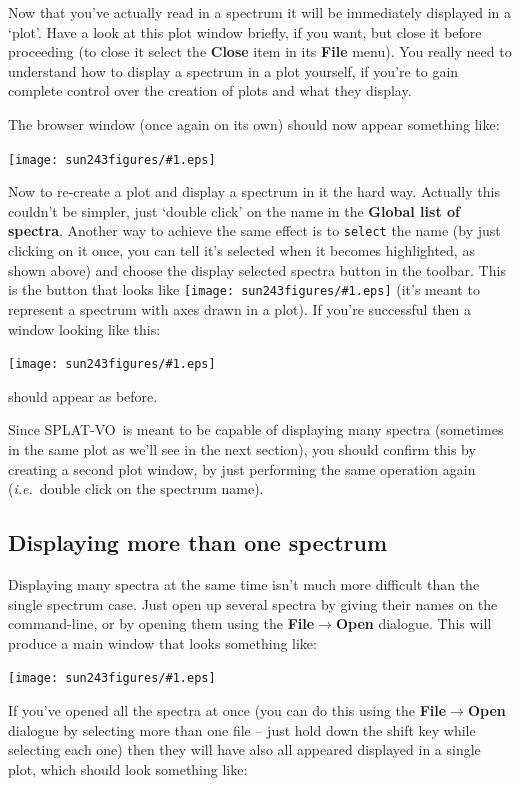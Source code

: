 \documentclass[twoside,11pt]{article}
\newcommand{\htmladdimg}[1]{}
\newcommand{\latexhtml}[2]{#1}
\newcommand{\xlabel}[1]{}
\renewcommand{\_}{\texttt{\symbol{95}}}
\newcommand{\SPLAT}{\textsf{SPLAT-VO}}
\newcommand{\mainfigure}[1]
{\begin{center}
 \latexhtml{\texttt{[image: sun243\_figures/\#1.eps]}}{\htmladdimg{#1.gif}}
 \end{center}
}
\newcommand{\inline}[1]
        {\latexhtml{\texttt{[image: sun243\_figures/\#1.eps]}}
        {\htmladdimg[align=center]{#1.gif}}}
\newcommand{\menuitem}[1]{\textbf{#1}}
\newcommand{\submenuitem}[2]{\latexhtml{\textbf{#1$\rightarrow$#2}}{\textbf{#1->#2}}}
\newcommand{\labelitem}[1]{\textbf{#1}}
\newcommand{\hitext}[1]{\texttt{#1}}
\newcommand{\ie}{\textit{i.e.}}
\begin{document}
Now that you've actually read in a spectrum it will be immediately
displayed in a `plot'. Have a look at this plot window briefly, if you
want, but close it before proceeding (to close it select the
\menuitem{Close} item in its \menuitem{File} menu). You really need to
understand how to display a spectrum in a plot yourself, if you're to
gain complete control over the creation of plots and what they
display.

The browser window (once again on its own) should now appear something
like:

\mainfigure{browser2}

Now to re-create a plot and display a spectrum in it the hard
way. Actually this couldn't be simpler, just `double click' on the
name in the \labelitem{Global list of spectra}. Another way to achieve
the same effect is to \hitext{select} the name (by just clicking on it
once, you can tell it's selected when it becomes highlighted, as shown
above) and choose the display selected spectra button in the
toolbar. This is the button that looks like \inline{display} (it's
meant to represent a spectrum with axes drawn in a plot). If you're
successful then a window looking like this:

\mainfigure{plot1}

should appear as before.

Since \SPLAT\ is meant to be capable of displaying many spectra
(sometimes in the same plot as we'll see in the next section), you
should confirm this by creating a second plot window, by just
performing the same operation again (\ie\ double click on the
spectrum name).

\newpage
\subsection{Displaying more than one spectrum\xlabel{displaying_more_than_one_spectrum}}

Displaying many spectra at the same time isn't much more difficult
than the single spectrum case. Just open up several spectra by giving
their names on the command-line, or by opening them using the
\submenuitem{File}{Open} dialogue. This will produce a main window that
looks something like:

\mainfigure{browser3}

If you've opened all the spectra at once (you can do this using the
\submenuitem{File}{Open} dialogue by selecting more than one file --
just hold down the shift key while selecting each one) then they will
have also all appeared displayed in a single plot, which should look
something like:
\end{document}
